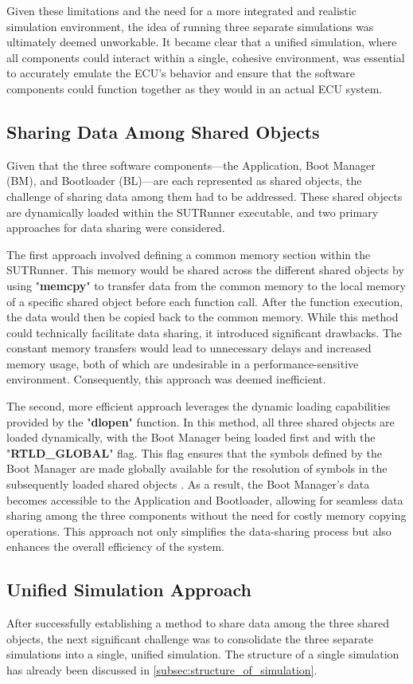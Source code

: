 Given these limitations and the need for a more integrated and realistic simulation environment, the idea of running three separate simulations was ultimately deemed unworkable. It became clear that a unified simulation, where all components could interact within a single, cohesive environment, was essential to accurately emulate the ECU’s behavior and ensure that the software components could function together as they would in an actual ECU system.
\newpage
\subsection{Sharing Data Among Shared Objects}
Given that the three software components—the Application, Boot Manager (BM), and Bootloader (BL)—are each represented as shared objects, the challenge of sharing data among them had to be addressed. These shared objects are dynamically loaded within the SUTRunner executable, and two primary approaches for data sharing were considered.

The first approach involved defining a common memory section within the SUTRunner. This memory would be shared across the different shared objects by using "\textbf{memcpy}" to transfer data from the common memory to the local memory of a specific shared object before each function call. After the function execution, the data would then be copied back to the common memory. While this method could technically facilitate data sharing, it introduced significant drawbacks. The constant memory transfers would lead to unnecessary delays and increased memory usage, both of which are undesirable in a performance-sensitive environment. Consequently, this approach was deemed inefficient.

The second, more efficient approach leverages the dynamic loading capabilities provided by the "\textbf{dlopen}" function. In this method, all three shared objects are loaded dynamically, with the Boot Manager being loaded first and with the "\textbf{RTLD\_GLOBAL}" flag. This flag ensures that the symbols defined by the Boot Manager are made globally available for the resolution of symbols in the subsequently loaded shared objects \cite{dlopen_man_page}. As a result, the Boot Manager's data becomes accessible to the Application and Bootloader, allowing for seamless data sharing among the three components without the need for costly memory copying operations. This approach not only simplifies the data-sharing process but also enhances the overall efficiency of the system.

\subsection{Unified Simulation Approach}
After successfully establishing a method to share data among the three shared objects, the next significant challenge was to consolidate the three separate simulations into a single, unified simulation. The structure of a single simulation has already been discussed in \autoref{subsec:structure_of_simulation}.

